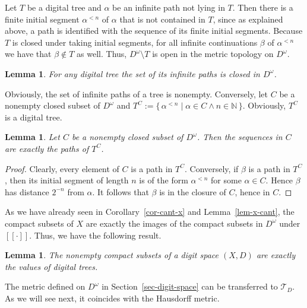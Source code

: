 \documentclass[microtype]{jloganal}
\theoremstyle{plain}
\newtheorem{lemma}[theorem]{Lemma}
\theoremstyle{definition}
\newcommand{\NN}{\mathbb{N}}
\newcommand{\TTT}{\mathcal{T}}
\newcommand{\val}[1]{[\![#1]\!]}
\newcommand{\set}[2]{\mbox{$\{\,#1 \mid #2 \,\}$}}
\begin{document}
Let $T$ be a digital tree and $\alpha$ be an infinite path not lying in $T$. Then there is a finite initial segment $\alpha^{< n}$ of $\alpha$ that is not contained in $T$, since as explained above, a path is identified with the sequence of its finite initial segments. Because $T$ is closed under taking initial segments, for all infinite continuations $\beta$ of $\alpha^{< n}$ we have that $\beta \not\in T$ as well. Thus, $D^\omega \setminus T$ is open in the metric topology on $D^\omega$.

\begin{lemma} \label{lem-treecl}
For any digital tree the set of its infinite paths is closed in $D^\omega$.
\end{lemma}

Obviously, the set of infinite paths of a tree is nonempty. Conversely, let $C$ be a nonempty closed subset of $D^\omega$ and $T^C := \set{\alpha^{< n}}{\alpha \in C \wedge n \in \NN}$. Obviously, $T^C$ is a digital tree. 


\begin{lemma}
Let $C$ be a nonempty closed subset of $D^\omega$. Then the sequences in $C$ are exactly the paths of $T^C$.
\end{lemma}
\begin{proof}
Clearly, every element of $C$ is a path in $T^C$. Conversely, if $\beta$ is 
a path in $T^C$, then its initial segment of length $n$ is of the form 
$\alpha^{<n}$ for some $\alpha\in C$. Hence $\beta$ has distance 
$2^{-n}$ from $\alpha$. It follows that $\beta$ is in the closure of $C$,
hence in $C$.
\end{proof}

As we have already seen in Corollary~\ref{cor-cant-x} and Lemma~\ref{lem-x-cant}, the compact subsets of $X$ are exactly the images of the compact subsets in $D^\omega$ under $\val{\cdot}$. Thus, we have the following result.

\begin{lemma}
\label{lem-tree-compact}
The nonempty compact subsets of a digit space $(X,D)$ are exactly
the values of digital trees.
\end{lemma}

The metric defined on $D^\omega$ in Section~\ref{sec-digit-space} can be transferred to $\TTT_D$. As we will see next, it coincides with the Hausdorff metric.
\end{document}
